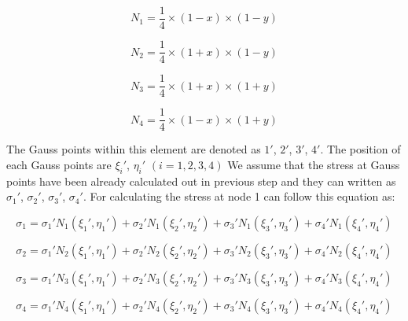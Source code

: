 \begin{equation}
N_1 = \frac{1}{4}\times\left(1 - x\right) \times \left(1 - y \right) 
\end{equation}  

\begin{equation}
N_2 = \frac{1}{4}\times\left(1 + x\right) \times \left(1 - y \right) 
\end{equation}  

\begin{equation}
N_3 = \frac{1}{4}\times\left(1 + x\right) \times \left(1 + y \right) 
\end{equation}  

\begin{equation}
N_4 = \frac{1}{4}\times\left(1 - x\right) \times \left(1 + y \right) 
\end{equation}  

The Gauss points within this element are denoted as $1'$, $2'$, $3'$, $4'$. The position of each Gauss points are ${\xi_i}'$, ${\eta_i}'$ $\left(i = 1, 2, 3, 4\right)$ We assume that the stress at Gauss points have been already calculated out in previous step and they can written as ${\sigma_1}'$, ${\sigma_2}'$, ${\sigma_3}'$, ${\sigma_4}'$. For calculating the stress at node 1 can follow this equation as:

\begin{equation}
\sigma_1 = {\sigma_1}' N_1\left({\xi_1}', {\eta_1}'\right) + {\sigma_2}' N_1\left({\xi_2}', {\eta_2}'\right) + {\sigma_3}' N_1\left({\xi_3}', {\eta_3}'\right) + {\sigma_4}' N_1\left({\xi_4}', {\eta_4}'\right)
\end{equation}

\begin{equation}
\sigma_2 = {\sigma_1}' N_2\left({\xi_1}', {\eta_1}'\right) + {\sigma_2}' N_2\left({\xi_2}', {\eta_2}'\right) + {\sigma_3}' N_2\left({\xi_3}', {\eta_3}'\right) + {\sigma_4}' N_2\left({\xi_4}', {\eta_4}'\right)
\end{equation}

\begin{equation}
\sigma_3 = {\sigma_1}' N_3\left({\xi_1}', {\eta_1}'\right) + {\sigma_2}' N_3\left({\xi_2}', {\eta_2}'\right) + {\sigma_3}' N_3\left({\xi_3}', {\eta_3}'\right) + {\sigma_4}' N_3\left({\xi_4}', {\eta_4}'\right)
\end{equation}

\begin{equation}
\sigma_4 = {\sigma_1}' N_4\left({\xi_1}', {\eta_1}'\right) + {\sigma_2}' N_4\left({\xi_2}', {\eta_2}'\right) + {\sigma_3}' N_4\left({\xi_3}', {\eta_3}'\right) + {\sigma_4}' N_4\left({\xi_4}', {\eta_4}'\right)
\end{equation}

